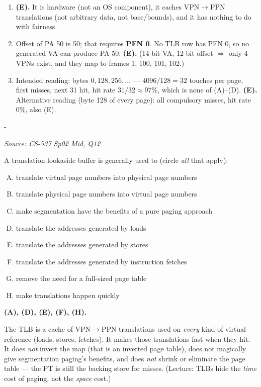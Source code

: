 \documentclass[11pt,a4paper]{article}
\makeatletter
\newcommand{\keepspace}[1]{\par\penalty-100\begingroup
  \setlength{\dimen@}{#1}\dimen@ii\pagegoal\advance\dimen@ii-\pagetotal
  \ifdim\dimen@>\dimen@ii\ifdim\dimen@ii>\z@\vfil\fi\break\fi\endgroup}
\newcounter{qn}[section]
\newenvironment{Qn}[4]{%
  \refstepcounter{qn}\keepspace{7\baselineskip}%
  \begin{tcolorbox}[qboxstyle, title={Q\thesection.\theqn\ \ [#1 \textbar\ #2]\ \ #4}]%
  {\footnotesize\color{g3}\textit{Source: #3}}\par\smallskip%
}{%
  \end{tcolorbox}%
}
\newenvironment{Sol}{%
  \begin{tcolorbox}[sboxstyle, title={Solution}]%
}{%
  \end{tcolorbox}\vspace{0.35em}%
}
\makeatother
\begin{document}
\begin{Sol}
\begin{enumerate}[(21)]
\item \textbf{(E).} It is hardware (not an OS component), it caches
      VPN$\to$PPN translations (not arbitrary data, not base/bounds),
      and it has nothing to do with fairness.
\item Offset of PA 50 is 50; that requires \textbf{PFN 0}. No TLB row
      has PFN 0, so no generated VA can produce PA 50. \textbf{(E).}
      (14-bit VA, 12-bit offset $\Rightarrow$ only 4 VPNs exist, and
      they map to frames 1, 100, 101, 102.)
\item Intended reading: bytes $0,128,256,\ldots$ --- $4096/128=32$
      touches per page, first misses, next 31 hit, hit rate
      $31/32\approx 97\%$, which is none of (A)--(D). \textbf{(E).}
      Alternative reading (byte 128 of every page): all compulsory
      misses, hit rate $0\%$, also (E).
\end{enumerate}
\end{Sol}

\begin{Qn}{Easy-Medium}{Lect 13}{CS-537 Sp02 Mid, Q12}{Circle every true statement about a TLB}
A translation lookaside buffer is generally used to (circle \emph{all}
that apply):
\begin{enumerate}[(A)]
\item translate virtual page numbers into physical page numbers
\item translate physical page numbers into virtual page numbers
\item make segmentation have the benefits of a pure paging approach
\item translate the addresses generated by loads
\item translate the addresses generated by stores
\item translate the addresses generated by instruction fetches
\item remove the need for a full-sized page table
\item make translations happen quickly
\end{enumerate}
\end{Qn}
\begin{Sol}
\textbf{(A), (D), (E), (F), (H).}

The TLB is a cache of VPN$\to$PPN translations used on \emph{every}
kind of virtual reference (loads, stores, fetches). It makes those
translations fast when they hit. It does \emph{not} invert the map
(that is an inverted page table), does not magically give segmentation
paging's benefits, and does \emph{not} shrink or eliminate the page
table --- the PT is still the backing store for misses. (Lecture: TLBs
hide the \emph{time} cost of paging, not the \emph{space} cost.)
\end{Sol}
\end{document}
